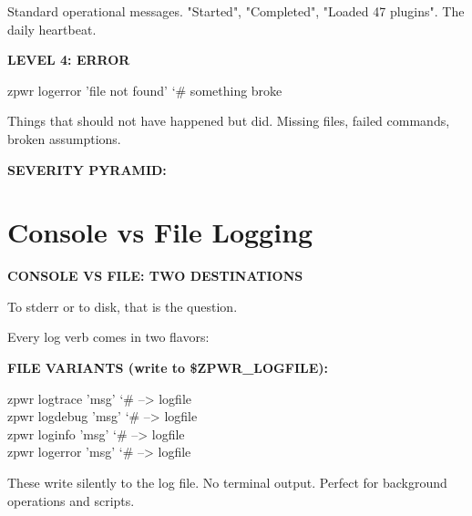 \documentclass[11pt,a4paper,twoside]{book}
\begin{document}
Standard operational messages. "Started", "Completed", "Loaded 47 plugins". The daily heartbeat.


\vspace{12pt}
{\bfseries\color{neonyellow} LEVEL 4: ERROR}\vspace{4pt}

\begin{codebox}
\color{neongreen}zpwr logerror 'file not found' {\char`\#} something broke\\
\end{codebox}

Things that should not have happened but did. Missing files, failed commands, broken assumptions.


\vspace{12pt}
{\bfseries\color{neonyellow} SEVERITY PYRAMID:}\vspace{4pt}


\vspace{16pt}

\section{Console vs File Logging}


\vspace{10pt}
{\large\bfseries\color{neoncyan} CONSOLE VS FILE: TWO DESTINATIONS}\vspace{6pt}

To stderr or to disk, that is the question.

Every log verb comes in two flavors:


\vspace{12pt}
{\bfseries\color{neonyellow} FILE VARIANTS (write to \$\textbf{ZPWR\_LOGFILE}):}\vspace{4pt}

\begin{codebox}
\color{neongreen}zpwr logtrace 'msg'          {\char`\#} --> logfile\\
\color{neongreen}zpwr logdebug 'msg'          {\char`\#} --> logfile\\
\color{neongreen}zpwr loginfo 'msg'           {\char`\#} --> logfile\\
\color{neongreen}zpwr logerror 'msg'          {\char`\#} --> logfile\\
\end{codebox}

These write silently to the log file. No terminal output. Perfect for background operations and scripts.
\end{document}
